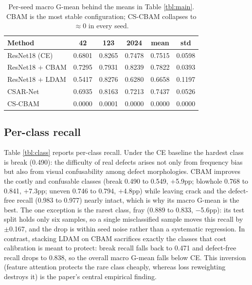 \documentclass[a4paper,fleqn]{cas-sc}
\begin{document}
\begin{sloppypar}
	\begin{table}[pos=htbp]
		\footnotesize
		\caption{Per-seed macro G-mean behind the means in Table \ref{tbl:main}. CBAM is the most stable configuration; CS-CBAM collapses to $\approx$0 in every seed.}
		\label{tbl:seeds}
		\centering
		\setlength{\tabcolsep}{3pt}
		\begin{tabular}{lccccc}
		\hline
		\textbf{Method} & \textbf{42} & \textbf{123} & \textbf{2024} & \textbf{mean} & \textbf{std} \\ \hline
		ResNet18 (CE) & 0.6801 & 0.8265 & 0.7478 & 0.7515 & 0.0598 \\
		ResNet18 $+$ CBAM & 0.7295 & 0.7931 & 0.8239 & 0.7822 & 0.0393 \\
		ResNet18 $+$ LDAM & 0.5417 & 0.8276 & 0.6280 & 0.6658 & 0.1197 \\
		CSAR-Net & 0.6935 & 0.8163 & 0.7213 & 0.7437 & 0.0526 \\
		CS-CBAM & 0.0000 & 0.0001 & 0.0000 & 0.0000 & 0.0000 \\
		\hline
		\end{tabular}
	\end{table}

	\subsection{Per-class recall}
	\label{sec:perclass}
	\par{
		Table \ref{tbl:class} reports per-class recall. Under the CE baseline the hardest class is break (0.490): the difficulty of real defects arises not only from frequency bias but also from visual confusability among defect morphologies. CBAM improves the costly and confusable classes (break 0.490 to 0.549, $+$5.9pp; blowhole 0.768 to 0.841, $+$7.3pp; uneven 0.746 to 0.794, $+$4.8pp) while leaving crack and the defect-free recall (0.983 to 0.977) nearly intact, which is why its macro G-mean is the best. The one exception is the rarest class, fray (0.889 to 0.833, $-$5.6pp): its test split holds only six samples, so a single misclassified sample moves this recall by $\pm$0.167, and the drop is within seed noise rather than a systematic regression. In contrast, stacking LDAM on CBAM sacrifices exactly the classes that cost calibration is meant to protect: break recall falls back to 0.471 and defect-free recall drops to 0.838, so the overall macro G-mean falls below CE. This inversion (feature attention protects the rare class cheaply, whereas loss reweighting destroys it) is the paper's central empirical finding.
	}


\end{sloppypar}
\end{document}
